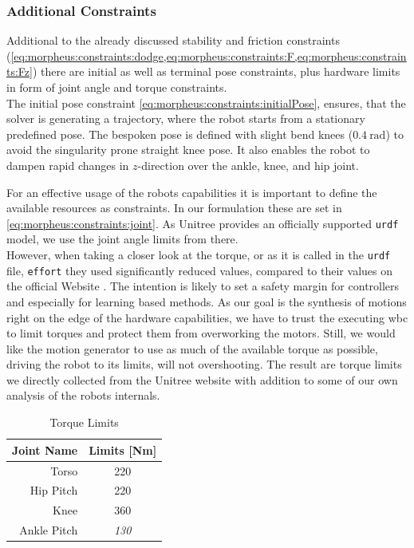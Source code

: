 \subsubsection{Additional Constraints}
Additional to the already discussed stability and friction constraints (\cref{eq:morpheus:constraints:dodge,eq:morpheus:constraints:F,eq:morpheus:constraints:Fz}) there are initial as well as terminal pose constraints, plus hardware limits in form of joint angle and torque constraints.
\\
The initial pose constraint \cref{eq:morpheus:constraints:initialPose}, ensures, that the solver is generating a trajectory, where the robot starts from a stationary predefined pose.
The bespoken pose is defined with slight bend knees ($\SI{0.4}{\radian}$) to avoid the singularity prone straight knee pose.
It also enables the robot to dampen rapid changes in $z$-direction over the ankle, knee, and hip joint.
\par
For an effective usage of the robots capabilities it is important to define the available resources as constraints.
In our formulation these are set in \cref{eq:morpheus:constraints:joint}.
As Unitree provides an officially supported \verb|urdf| model, we use the joint angle limits from there.
\\
However, when taking a closer look at the torque, or as it is called in the \verb|urdf| file, \verb|effort| they used significantly reduced values, compared to their values on the official Website \cite{unitreeH1-2}.
The intention is likely to set a safety margin for controllers and especially for learning based methods.
As our goal is the synthesis of motions right on the edge of the hardware capabilities, we have to trust the executing \acrfull{wbc} to limit torques and protect them from overworking the motors.
Still, we would like the motion generator to use as much of the available torque as possible, driving the robot to its limits, will not overshooting.
The result are torque limits we directly collected from the Unitree website \cite{unitreeH1-2} with addition to some of our own analysis of the robots internals.
\\
\begin{table}[H]
  \centering
  \begin{tabularx}{0.3\textwidth}{rc}
    \toprule
    Joint Name & Limits [Nm] \\
    \midrule
    Torso & 220 \\
    Hip Pitch & 220 \\
    Knee & 360 \\
    Ankle Pitch & \textit{130} \\
    \bottomrule
  \end{tabularx}
  \caption{Torque Limits}
  \label{tab:morpheus:limits}
\end{table}

